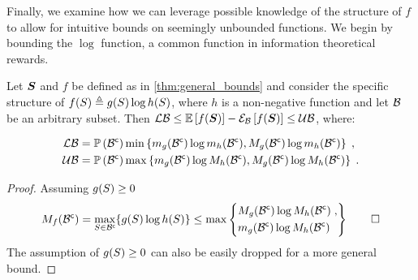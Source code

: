 Finally, we examine how we can leverage possible knowledge of the structure of $f$ to allow for intuitive bounds on seemingly unbounded functions. We begin by bounding the $\log$ function, a common function in information theoretical rewards.

\begin{proposition}
	\label{thm:bound_log}
	Let $\boldsymbol S$ and $f$ be defined as in \cref{thm:general_bounds} and consider the specific structure of $f(S)\triangleq g(S)\log h(S)$, where $h$ is a non-negative function and let $\mathcal B$ be an arbitrary subset. Then $\operatorname*{\mathcal{LB}}\leq\operatorname*{\mathbb{E}}\limits_{}\left[{f(\boldsymbol S)}\right]-\mathcal{E}_{\mathcal B}\left[{f(\boldsymbol S)}\right]\leq\operatorname*{\mathcal{UB}}$, where:
	\begin{subequations}
		\begin{align}
			\operatorname*{\mathcal{LB}} & = \mathbb{P}\left({{\mathcal B}^{\mathsf{c}}}\right)
			\min\left\{m_g({\mathcal B}^{\mathsf{c}})\log m_h({\mathcal B}^{\mathsf{c}}),M_g({\mathcal B}^{\mathsf{c}})\log m_h({\mathcal B}^{\mathsf{c}})\right\}\;,\label{eq:bound_lower_log}\\
			\operatorname*{\mathcal{UB}} & = \mathbb{P}\left({{\mathcal B}^{\mathsf{c}}}\right)
			\max\left\{m_g({\mathcal B}^{\mathsf{c}})\log M_h({\mathcal B}^{\mathsf{c}}),M_g({\mathcal B}^{\mathsf{c}})\log M_h({\mathcal B}^{\mathsf{c}})\right\}\;\label{eq:bound_upper_log}.
		\end{align}
	\end{subequations}
\end{proposition}
\begin{proof}
	Assuming $g(S)\geq 0$
	\begin{equation*}
		M_f({\mathcal B}^{\mathsf{c}})=\max_{S\in{\ensuremath{\mathcal B}}^{\mathsf{c}}}\{g(S)\log h(S)\}\leq\max\left\{
		\begin{aligned}
			& M_g({\mathcal B}^{\mathsf{c}})\log M_h({\mathcal B}^{\mathsf{c}})\;, \\
			& m_g({\mathcal B}^{\mathsf{c}})\log M_h({\mathcal B}^{\mathsf{c}})
		\end{aligned}\right\}\qed
	\end{equation*}
	The assumption of $g(S)\geq 0$ can also be easily dropped for a more general bound.
\end{proof}

